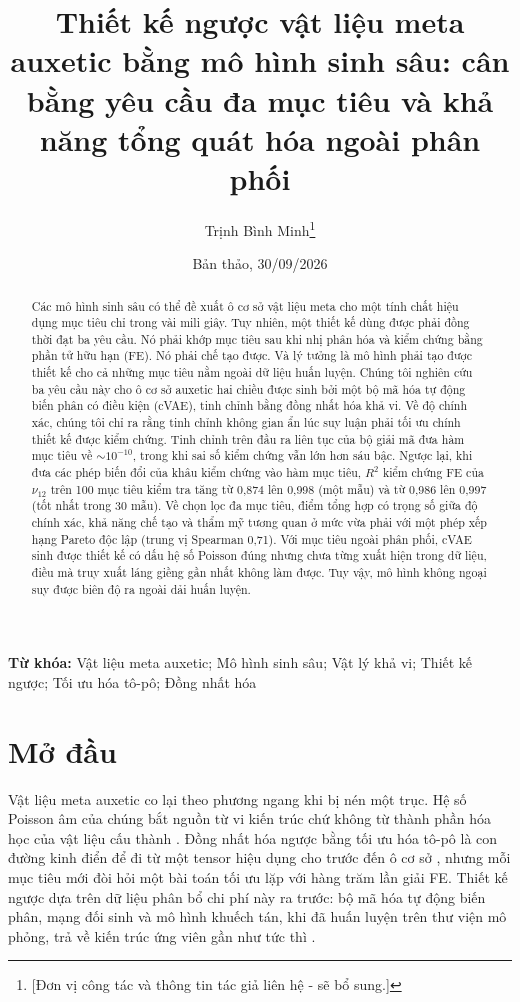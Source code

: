 \documentclass[a4paper,11pt]{article}
\title{Thiết kế ngược vật liệu meta auxetic bằng mô hình sinh sâu: cân bằng
yêu cầu đa mục tiêu và khả năng tổng quát hóa ngoài phân phối}
\author{Trịnh Bình Minh\thanks{[Đơn vị công tác và thông tin tác giả liên hệ - sẽ bổ sung.]}}
\date{Bản thảo, 30/09/2026}
\newcommand{\nuot}{\nu_{12}}
\newcommand{\RR}{R^2}
\begin{document}
\maketitle

\begin{abstract}
Các mô hình sinh sâu có thể đề xuất ô cơ sở vật liệu meta cho một tính chất
hiệu dụng mục tiêu chỉ trong vài mili giây. Tuy nhiên, một thiết kế dùng được
phải đồng thời đạt ba yêu cầu. Nó phải khớp mục tiêu sau khi nhị phân hóa và
kiểm chứng bằng phần tử hữu hạn (FE). Nó phải chế tạo được. Và lý tưởng là
mô hình phải tạo được thiết kế cho cả những mục tiêu nằm ngoài dữ liệu huấn
luyện. Chúng tôi nghiên cứu ba yêu cầu này cho ô cơ sở auxetic hai chiều
được sinh bởi một bộ mã hóa tự động biến phân có điều kiện (cVAE), tinh
chỉnh bằng đồng nhất hóa khả vi. Về độ chính xác, chúng tôi chỉ ra rằng tinh
chỉnh không gian ẩn lúc suy luận phải tối ưu chính thiết kế được kiểm chứng.
Tinh chỉnh trên đầu ra liên tục của bộ giải mã đưa hàm mục tiêu về
$\sim\!10^{-10}$, trong khi sai số kiểm chứng vẫn lớn hơn sáu bậc. Ngược lại,
khi đưa các phép biến đổi của khâu kiểm chứng vào hàm mục tiêu, $\RR$ kiểm
chứng FE của $\nuot$ trên 100 mục tiêu kiểm tra tăng từ 0,874 lên 0,998 (một
mẫu) và từ 0,986 lên 0,997 (tốt nhất trong 30 mẫu). Về chọn lọc đa mục
tiêu, điểm tổng hợp có trọng số giữa độ chính xác, khả năng chế tạo và thẩm
mỹ tương quan ở mức vừa phải với một phép xếp hạng Pareto độc lập (trung vị
Spearman 0,71). Với mục tiêu ngoài phân phối, cVAE sinh được thiết kế có
dấu hệ số Poisson đúng nhưng chưa từng xuất hiện trong dữ liệu, điều mà truy
xuất láng giềng gần nhất không làm được. Tuy vậy, mô hình không ngoại suy
được biên độ ra ngoài dải huấn luyện.
\end{abstract}

\noindent\textbf{Từ khóa:} Vật liệu meta auxetic; Mô hình sinh sâu; Vật lý
khả vi; Thiết kế ngược; Tối ưu hóa tô-pô; Đồng nhất hóa

\section{Mở đầu}

Vật liệu meta auxetic co lại theo phương ngang khi bị nén một trục. Hệ số
Poisson âm của chúng bắt nguồn từ vi kiến trúc chứ không từ thành phần hóa
học của vật liệu cấu thành
\citep{lakes1987foam,evans2000auxetic,bertoldi2017flexible}. Đồng nhất hóa
ngược bằng tối ưu hóa tô-pô là con đường kinh điển để đi từ một tensor hiệu
dụng cho trước đến ô cơ sở
\citep{sigmund1994materials,larsen1997design,bendsoe2003topology}, nhưng mỗi
mục tiêu mới đòi hỏi một bài toán tối ưu lặp với hàng trăm lần giải FE.
Thiết kế ngược dựa trên dữ liệu phân bổ chi phí này ra trước: bộ mã hóa tự
động biến phân, mạng đối sinh và mô hình khuếch tán, khi đã huấn luyện trên
thư viện mô phỏng, trả về kiến trúc ứng viên gần như tức thì
\citep{wang2020deep,mao2020gan,kumar2020spinodoid,bastek2022inverting,kollmann2020deep,zheng2021controllable,pahlavani2024deep,bastek2023diffusion}.
\end{document}
